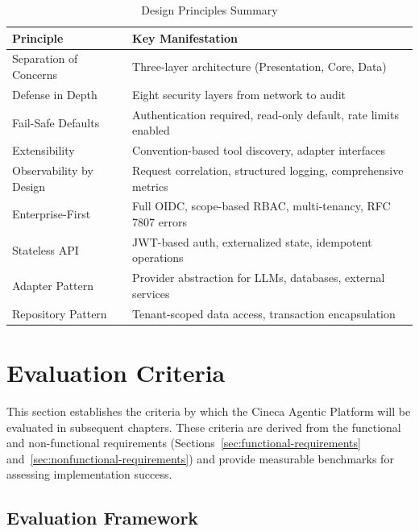 \documentclass[a4paper,twoside]{sapthesis}
\begin{document}
\begin{table}[htbp]
\centering
\caption{Design Principles Summary}
\label{tab:principle-summary}
\small
\begin{tabular}{|l|p{10cm}|}
\hline
\textbf{Principle} & \textbf{Key Manifestation} \\
\midrule
Separation of Concerns & Three-layer architecture (Presentation, Core, Data) \\
\midrule
Defense in Depth & Eight security layers from network to audit \\
\midrule
Fail-Safe Defaults & Authentication required, read-only default, rate limits enabled \\
\midrule
Extensibility & Convention-based tool discovery, adapter interfaces \\
\midrule
Observability by Design & Request correlation, structured logging, comprehensive metrics \\
\midrule
Enterprise-First & Full OIDC, scope-based RBAC, multi-tenancy, RFC 7807 errors \\
\midrule
Stateless API & JWT-based auth, externalized state, idempotent operations \\
\midrule
Adapter Pattern & Provider abstraction for LLMs, databases, external services \\
\midrule
Repository Pattern & Tenant-scoped data access, transaction encapsulation \\
\midrule
\end{tabular}
\end{table}

\section{Evaluation Criteria}
\label{sec:evaluation-criteria}

This section establishes the criteria by which the Cineca Agentic Platform will be evaluated in subsequent chapters. These criteria are derived from the functional and non-functional requirements (Sections~\ref{sec:functional-requirements} and~\ref{sec:nonfunctional-requirements}) and provide measurable benchmarks for assessing implementation success.

\subsection{Evaluation Framework}
\label{subsec:evaluation-framework}
\end{document}

